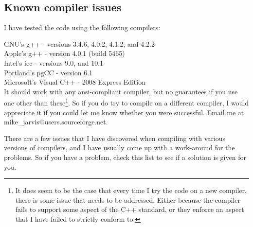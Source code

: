\documentclass[twoside,letterpaper,11pt]{article}
\makeatletter
\newcommand{\myemail}{mike\_jarvis@users.sourceforge.net}
\makeatother
\begin{document}
\subsection{Known compiler issues}

I have tested the code using the following compilers:

$\quad$\\
GNU's g++ - versions 3.4.6, 4.0.2, 4.1.2, and 4.2.2\\
Apple's g++ - version 4.0.1 (build 5465)\\
Intel's icc - versions 9.0, and 10.1\\
Portland's pgCC - version 6.1\\
Microsoft's Visual C++ - 2008 Express Edition\\

It should work with any ansi-compliant
compiler, but no guarantees if you use one other than these\footnote{
It does seem to be the case that 
every time I try the code on a new compiler, there is some issue that needs to be addressed.  
Either because the compiler fails to support some aspect of the C++ standard, or they enforce
an aspect that I have failed to strictly conform to.}.
  So if you do try to compile on a different compiler, 
I would appreciate it if you could let me know whether you were successful.  
Email me at \myemail.

There are a few issues that I have discovered when compiling with various 
versions of compilers, and I have usually come up with a work-around for
the problems.  So if you have a problem, check this list to see if a solution
is given for you.  
\end{document}
